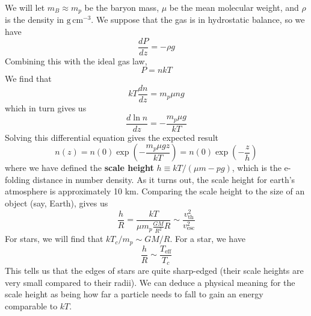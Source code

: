\documentclass[10pt]{article}
\newcommand{\n}{\noindent}
\begin{document}
	 \n We will let $m_B\approx m_p$ be the baryon mass, $\mu$ be the mean molecular weight, and $\rho$ is the density in $\mathrm{g\,cm^{-3}}$. We suppose that the gas is in hydrostatic balance, so we have
	 \begin{equation}
	 	\label{ippa.1} \frac{dP}{dz}=-\rho g
	 \end{equation}
	 Combining this with the ideal gas law,
	 \begin{equation}
	 	\label{ippa.2} P=nkT
	 \end{equation}
	We find that
	\begin{equation}
		\label{ippa.3} kT\frac{dn}{dz}=m_p\mu ng
	\end{equation}
	which in turn gives us
	\begin{equation}
		\label{ippa.4} \frac{d\ln n}{dz}=-\frac{m_p\mu g}{kT}
	\end{equation}
	Solving this differential equation gives the expected result
	\begin{equation}
		\label{ippa.5} n(z)=n(0)\exp\left(-\frac{m_p\mu gz}{kT}\right)=n(0)\exp\left(-\frac{z}{h}\right)
	\end{equation}
	where we have defined the \textbf{scale height} $h\equiv kT/(\mu m-pg)$, which is the e-folding distance in number density. As it turns out, the scale height for earth's atmosphere is approximately 10 km. Comparing the scale height to the size of an object (say, Earth), gives us
	\begin{equation}
		\label{ippa.6} \frac{h}{R}=\frac{kT}{\mu m_p\frac{GM}{R^2}R}\sim \frac{v_{\mathrm{th}}^2}{v_{\mathrm{esc}}^2}
	\end{equation}
	For stars, we will find that $kT_c/m_p\sim GM/R$. For a star, we have
	\begin{equation}
		\label{ippa.7} \frac{h}{R}\sim \frac{T_{\mathrm{eff}}}{T_c}
	\end{equation}
	This tells us that the edges of stars are quite sharp-edged (their scale heights are very small compared to their radii). We can deduce a physical meaning for the scale height as being how far a particle needs to fall to gain an energy comparable to $kT$.\\
	
\end{document}
